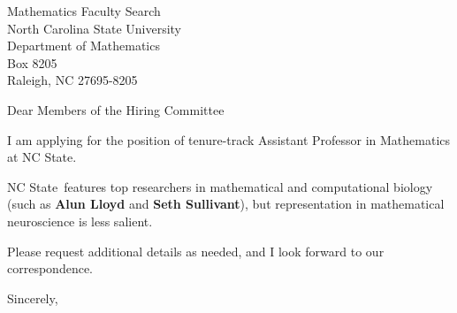 




	
	
	\def\School{NC State}
	
	\begin{letter}
		{Mathematics Faculty Search\\
		North Carolina State University\\
		Department of Mathematics\\
		Box 8205\\
		Raleigh, NC 27695-8205
		}
		
		\opening{Dear Members of the Hiring Committee}
		
		
		I am applying for the position of tenure-track Assistant Professor in Mathematics at \School. 
		
		\School~features top researchers in mathematical and computational biology (such as \textbf{Alun Lloyd} and \textbf{Seth Sullivant}), but representation in mathematical neuroscience is less salient.  
		
		
		
		
		
		Please request additional details as needed, and I look forward to our correspondence.
		
		\closing{Sincerely,}
	\end{letter}
